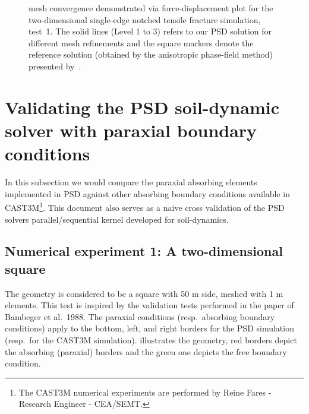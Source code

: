 \documentclass{report}
\begin{document}
\begin{figure}[tb]
\begin{minipage}{1\textwidth}
	\end{minipage}
	\caption{mesh convergence demonstrated via force-displacement plot for the two-dimensional single-edge notched tensile fracture simulation, test~1. The solid lines (Level 1 to 3) refers to our PSD solution for different mesh refinements and the square markers denote the reference solution (obtained by the anisotropic phase-field method) presented by~\cite{amor2009regularized}.\label{fig:force-comp-2d-tensile-crack}}
\end{figure}

\section{Validating the PSD soil-dynamic solver with paraxial boundary conditions}
In this subsection we would compare the paraxial absorbing elements implemented in PSD against other absorbing boundary conditions available in CAST3M\footnote{The CAST3M numerical experiments are performed by Reine Fares - Research Engineer - CEA/SEMT.}. This document also serves as a naive cross validation of the PSD solvers parallel/sequential kernel developed for soil-dynamics.

\subsection{Numerical experiment 1: A two-dimensional square}
The geometry is considered to be a square with 50 m side, meshed with 1 m elements. This test is inspired by the validation tests performed in the paper of Bambeger et al.~1988. The paraxial conditions (resp.~absorbing boundary conditions)  apply to the bottom, left, and right borders for the PSD simulation (resp.~for the CAST3M simulation).  illustrates the geometry, red borders depict the absorbing (paraxial) borders and the green one depicts the free boundary condition. 
\end{document}
